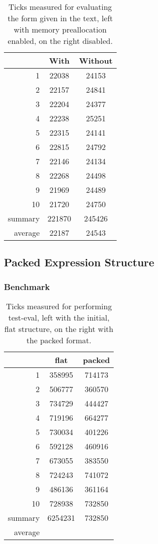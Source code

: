 \documentclass[12pt]{article}
\begin{document}
\begin{table}
    \centering
    \begin{tabular}{r|c|c}
           & With  & Without \\
        \hline 
         1 & 22038 & 24153 \\
         2 & 22157 & 24841 \\
         3 & 22204 & 24377 \\
         4 & 22238 & 25251 \\
         5 & 22315 & 24141 \\
         6 & 22815 & 24792 \\
         7 & 22146 & 24134 \\
         8 & 22268 & 24498 \\
         9 & 21969 & 24489 \\
        10 & 21720 & 24750 \\
        \hline
        summary & 221870 & 245426 \\
        \hline
        average & 22187  & 24543
    \end{tabular}
    \caption{\label{tbl:BMResultsMemPreallocation} Ticks measured for evaluating
        the form given in the text, left with memory preallocation enabled, on
    the right disabled.}
\end{table}


\subsection{Packed Expression Structure}

\subsubsection{Benchmark}


\begin{table}
    \centering
    \begin{tabular}{r|c|c}
           & flat  & packed \\
        \hline 
         1 & 358995 & 714173 \\
         2 & 506777 & 360570 \\
         3 & 734729 & 444427 \\
         4 & 719196 & 664277 \\
         5 & 730034 & 401226 \\
         6 & 592128 & 460916 \\
         7 & 673055 & 383550 \\
         8 & 724243 & 741072 \\
         9 & 486136 & 361164 \\
        10 & 728938 & 732850 \\
        \hline
        summary & 6254231 & 732850 \\
        \hline
        average & & 
    \end{tabular}
    \caption{\label{tbl:BMResultsExpressionFormat} Ticks measured for performing
        test-eval, left with the initial, flat structure, on
    the right with the packed format.}
\end{table}
\end{document}
